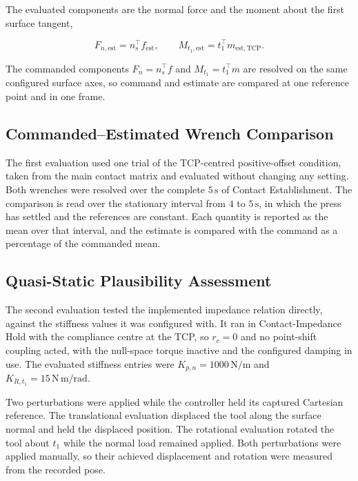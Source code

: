 The evaluated components are the normal force and the moment about the first
surface tangent,

\[
F_{n,\mathrm{est}}=n_s^\top f_{\mathrm{est}},
\qquad
M_{t_1,\mathrm{est}}=t_1^\top m_{\mathrm{est,TCP}}.
\]

The commanded components \mbox{\(F_n=n_s^\top f\)} and
\mbox{\(M_{t_1}=t_1^\top m\)} are resolved on the same configured surface axes,
so command and estimate are compared at one reference point and in one frame.


\subsection{Commanded--Estimated Wrench Comparison}
\label{subsec:wrench_comparison_method}

The first evaluation used one trial of the TCP-centred positive-offset
condition, taken from the main contact matrix and evaluated without changing
any setting. Both wrenches were resolved over the complete
\mbox{\(5\,\mathrm{s}\)} of Contact Establishment. The comparison is read over
the stationary interval from \mbox{\(4\)} to \mbox{\(5\,\mathrm{s}\)}, in which
the press has settled and the references are constant. Each quantity is
reported as the mean over that interval, and the estimate is compared with the
command as a percentage of the commanded mean.


\subsection{Quasi-Static Plausibility Assessment}
\label{subsec:plausibility_method}

The second evaluation tested the implemented impedance relation directly,
against the stiffness values it was configured with. It ran in
Contact-Impedance Hold with the compliance centre at the TCP, so
\mbox{\(r_c=0\)} and no point-shift coupling acted, with the null-space torque
inactive and the configured damping in use. The evaluated stiffness entries
were \mbox{\(K_{p,n}=1000\,\mathrm{N/m}\)} and
\mbox{\(K_{R,t_1}=15\,\mathrm{N\,m/rad}\)}.

Two perturbations were applied while the controller held its captured Cartesian
reference. The translational evaluation displaced the tool along the surface
normal and held the displaced position. The rotational evaluation rotated the
tool about \mbox{\(t_1\)} while the normal load remained applied. Both
perturbations were applied manually, so their achieved displacement and
rotation were measured from the recorded pose.

